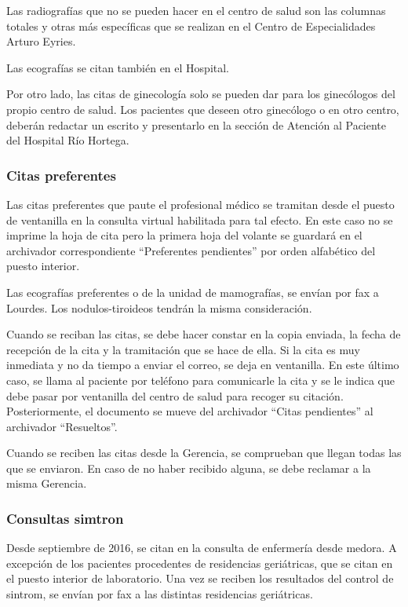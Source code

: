 Las radiografías que no se pueden hacer en el centro de salud son las columnas totales y otras más específicas que se realizan en el Centro de Especialidades Arturo Eyries.

Las ecografías se citan también en el Hospital.

Por otro lado, las citas de ginecología solo se pueden dar para los ginecólogos del propio centro de salud.
Los pacientes que deseen otro ginecólogo o en otro centro, deberán redactar un escrito y presentarlo en la sección de Atención al Paciente del Hospital Río Hortega.

\subsubsection{Citas preferentes}

Las citas preferentes que paute el profesional médico se tramitan desde el puesto de ventanilla en la consulta virtual habilitada para tal efecto.
En este caso no se imprime la hoja de cita pero la primera hoja del \gls{volante} se guardará en el archivador correspondiente ``Preferentes pendientes'' por orden alfabético del puesto interior.

Las ecografías preferentes o de la unidad de mamografías, se envían por fax a Lourdes.
Los \gls{nodulos-tiroideos} tendrán la misma consideración.

Cuando se reciban las citas, se debe hacer constar en la copia enviada, la fecha de recepción de la cita y la tramitación que se hace de ella.
Si la cita es muy inmediata y no da tiempo a enviar el correo, se deja en ventanilla.
En este último caso, se llama al paciente por teléfono para comunicarle la cita y se le indica que debe pasar por ventanilla del centro de salud para recoger su citación.
Posteriormente, el documento se mueve del archivador ``Citas pendientes'' al archivador ``Resueltos''.

Cuando se reciben las citas desde la Gerencia, se comprueban que llegan todas las que se enviaron. En caso de no haber recibido alguna, se debe reclamar a la misma Gerencia.

\subsubsection{Consultas simtron}

Desde septiembre de 2016, se citan en la consulta de enfermería desde \Gls{medora}.
A excepción de los pacientes procedentes de residencias geriátricas, que se citan en el puesto interior de laboratorio.
Una vez se reciben los resultados del control de \Gls{sintrom}, se envían por fax a las distintas residencias geriátricas.

